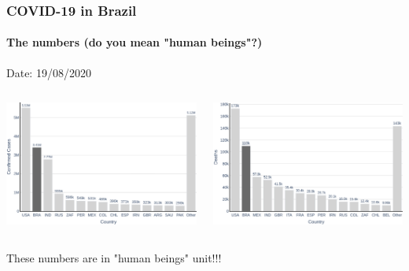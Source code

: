 \documentclass{beamer}
\begin{document}
\begin{frame} 
\frametitle{COVID-19 in Brazil} 
\framesubtitle{The numbers (do you mean "human beings"?)} 

\begin{center}
    Date: 19/08/2020
\end{center}

\begin{columns}
\begin{column}{0.5\textwidth}
    \begin{center}
    \includegraphics[width=1\textwidth]{figs/new_confirmed.pdf}
    \end{center}
\end{column}
\begin{column}{0.5\textwidth}  %
    \begin{center}
    \includegraphics[width=1\textwidth]{figs/new_deaths.pdf}
    \end{center}
\end{column}
\end{columns}

\vspace{2em}

\begin{center}
    These numbers are in "human beings" unit!!!
\end{center}

\end{frame}
\end{document}
